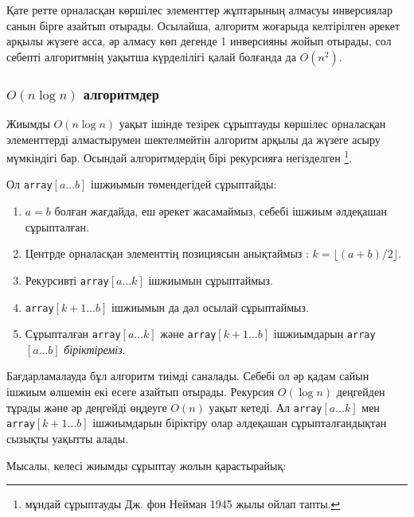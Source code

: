 Қате ретте орналасқан көршілес элементтер жұптарының алмасуы 
инверсиялар санын бірге азайтып отырады.
Осылайша, алгоритм жоғарыда келтірілген әрекет арқылы жүзеге асса, 
әр алмасу көп дегенде 1 инверсияны жойып отырады, 
сол себепті алгоритмнің уақытша күрделілігі қалай болғанда да $O(n^2)$.

\subsubsection{$O(n \log n)$ алгоритмдер}


Жиымды $O(n \log n)$ уақыт ішінде тезірек сұрыптауды
көршілес орналасқан элементтерді алмастырумен шектелмейтін
алгоритм арқылы да жүзеге асыру мүмкіндігі бар.
Осындай алгоритмдердің бірі рекурсияға негізделген 
\footnote{\cite{knu983}
мұндай сұрыптауды Дж. фон Нейман 1945 жылы ойлап тапты.}.

Ол \texttt{array}$[a \ldots b]$ ішжиымын төмендегідей сұрыптайды:

\begin{enumerate}
\item $a=b$ болған жағдайда, еш әрекет жасамаймыз, себебі ішжиым әлдеқашан сұрыпталған.
\item Центрде орналасқан элементтің позициясын анықтаймыз : $k=\lfloor (a+b)/2 \rfloor$.
\item Рекурсивті \texttt{array}$[a \ldots k]$ ішжиымын сұрыптаймыз.
\item \texttt{array}$[k+1 \ldots b]$ ішжиымын да дәл осылай сұрыптаймыз.
\item Сұрыпталған \texttt{array}$[a \ldots k]$ және
\texttt{array}$[k+1 \ldots b]$ ішжиымдарын \texttt{array}$[a \ldots b]$
\emph{біріктіреміз}.
\end{enumerate}

Бағдарламалауда бұл алгоритм тиімді саналады. Себебі 
ол әр қадам сайын ішжиым өлшемін екі есеге азайтып отырады.
Рекурсия $O(\log n)$ деңгейден тұрады
және әр деңгейді өңдеуге $O(n)$ уақыт кетеді.
Ал \texttt{array}$[a \ldots k]$ мен \texttt{array}$[k+1 \ldots b]$
ішжиымдарын біріктіру олар әлдеқашан сұрыпталғандықтан сызықты уақытты алады.

Мысалы, келесі жиымды сұрыптау жолын қарастырайық:
\begin{center}
\end{center}

